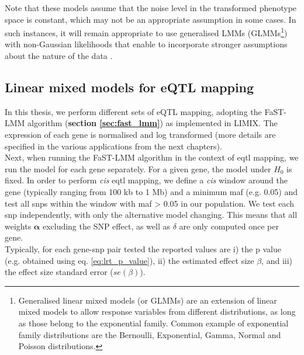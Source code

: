 Note that these models assume that the noise level in the transformed phenotype space is constant, which may not be an appropriate assumption in some cases. 
In such instances, it will remain appropriate to use generalised LMMs (GLMMs\footnote{Generalised linear mixed models (or GLMMs) are an extension of linear mixed models to allow response variables from different distributions, as long as those belong to the exponential family.
Common example of exponential family distributions are the Bernoulli, Exponential, Gamma, Normal and Poisson distributions.}) with non-Gaussian likelihoods that enable to incorporate stronger assumptions about the nature of the data \cite{fusi2014warped, lee2011estimating}. 

\newpage

\subsection{Linear mixed models for eQTL mapping}
\label{sec:lmm_eqtl}

In this thesis, we perform different sets of eQTL mapping, adopting the FaST-LMM algorithm (\textbf{section \ref{sec:fast_lmm}}) as implemented in LIMIX.
The expression of each gene is normalised and log transformed (more details are specified in the various applications from the next chapters). \\

Next, when running the FaST-LMM algorithm in the context of \gls{eqtl} mapping, we run the model for each gene separately.
For a given gene, the model under $H_0$ is fixed.
In order to perform \textit{cis} \gls{eqtl} mapping, we define a \textit{cis} window around the gene (typically ranging from 100 kb to 1 Mb) and a minimum \gls{maf} (e.g. 0.05) and test all \gls{snp}s within the window with \gls{maf} > 0.05 in our population.  
We test each \gls{snp} independently, with only the alternative model changing.
This means that all weights $\boldsymbol{\alpha}$ excluding the SNP effect, as well as $\delta$ are only computed once per gene.\\

Typically, for each gene-\gls{snp} pair tested the reported values are i) the p value (e.g. obtained using eq. \eqref{eq:lrt_p_value}), ii) the estimated effect size $\beta$, and iii) the effect size standard error ($se(\beta)$).


